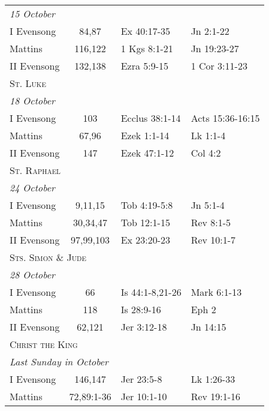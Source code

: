 \begin{longtable}{l c l l}
\multicolumn{4}{l}{\textit{15 October}}\\
\hspace{1em} I Evensong&84,87&Ex 40:17-35&Jn 2:1-22\\
\hspace{1em} Mattins&116,122&1 Kgs 8:1-21&Jn 19:23-27\\
\hspace{1em} II Evensong&132,138&Ezra 5:9-15&1 Cor 3:11-23\\
%
\multicolumn{4}{l}{\textsc{St. Luke}}\\
\multicolumn{4}{l}{\textit{18 October}}\\
\hspace{1em} I Evensong&103&Ecclus 38:1-14&Acts 15:36-16:15\\
\hspace{1em} Mattins&67,96&Ezek 1:1-14&Lk 1:1-4\\
\hspace{1em} II Evensong&147&Ezek 47:1-12&Col 4:2\\
%
\multicolumn{4}{l}{\textsc{St. Raphael}}\\
\multicolumn{4}{l}{\textit{24 October}}\\
\hspace{1em} I Evensong&9,11,15&Tob 4:19-5:8&Jn 5:1-4\\
\hspace{1em} Mattins&30,34,47&Tob 12:1-15&Rev 8:1-5\\
\hspace{1em} II Evensong&97,99,103&Ex 23:20-23&Rev 10:1-7\\
%
\multicolumn{4}{l}{\textsc{Sts. Simon \& Jude}}\\
\multicolumn{4}{l}{\textit{28 October}}\\
\hspace{1em} I Evensong&66&Is 44:1-8,21-26&Mark 6:1-13\\
\hspace{1em} Mattins&118&Is 28:9-16&Eph 2\\
\hspace{1em} II Evensong&62,121&Jer 3:12-18&Jn 14:15\\
\multicolumn{4}{l}{\textsc{Christ the King}}\\
\multicolumn{4}{l}{\textit{Last Sunday in October}}\\
\hspace{1em} I Evensong&146,147&Jer 23:5-8&Lk 1:26-33\\
\hspace{1em} Mattins&72,89:1-36&Jer 10:1-10&Rev 19:1-16\\

\end{longtable}
